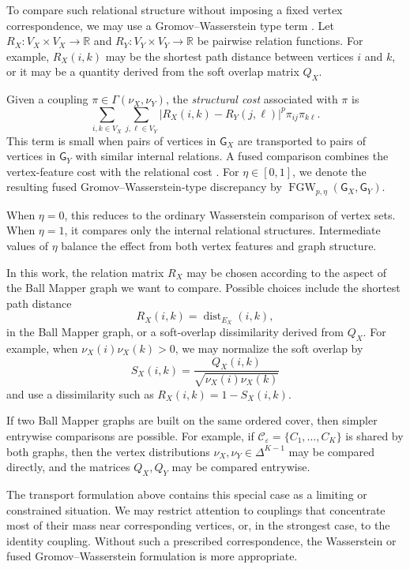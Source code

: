 \documentclass[9pt,a4paper,twocolumn,twoside]{extarticle}
\theoremstyle{definition}
\begin{document}
To compare such relational structure without imposing a fixed vertex correspondence, we may use a Gromov--Wasserstein type term \cite{memoli2011gromov}. Let $R_X:V_X\times V_X\to\mathbb R$ and $R_Y:V_Y\times V_Y\to\mathbb R$ be pairwise relation functions. For example, $R_X(i,k)$ may be the shortest path distance between vertices $i$ and $k$, or it may be a quantity derived from the soft overlap matrix $Q_X$.

Given a coupling $\pi \in \Gamma(\nu_X,\nu_Y)$, the \emph{structural cost} associated with $\pi$ is
\[
\sum_{i,k\in V_X}\sum_{j,\ell\in V_Y}\left|R_X(i,k)-R_Y(j,\ell)\right|^p \pi_{ij}\pi_{k\ell}.
\]
This term is small when pairs of vertices in $\mathsf G_X$ are transported to pairs of vertices in $\mathsf G_Y$ with similar internal relations. A fused comparison combines the vertex-feature cost with the relational cost \cite{vayer2019optimal}.  For $\eta\in[0,1]$, we denote the resulting fused Gromov--Wasserstein-type discrepancy by $\operatorname{FGW}_{p,\eta}(\mathsf{G}_X,\mathsf{G}_Y)$.

When $\eta=0$, this reduces to the ordinary Wasserstein comparison of vertex sets. When $\eta = 1$, it compares only the internal relational structures. Intermediate values of $\eta$ balance the effect from both vertex features and graph structure.

In this work, the relation matrix $R_X$ may be chosen according to the aspect of the Ball Mapper graph we want to compare. Possible choices include the shortest path distance
\[
R_X(i,k)=\operatorname{dist}_{E_X}(i,k),
\]
in the Ball Mapper graph, or a soft-overlap dissimilarity derived from $Q_X$. For example, when $\nu_X(i)\nu_X(k)>0$, we may normalize the soft overlap by
\[
S_X(i,k) =\frac{Q_X(i,k)}{\sqrt{\nu_X(i)\nu_X(k)}}
\]
and use a dissimilarity such as $R_X(i,k) = 1 - S_X(i,k)$.

If two Ball Mapper graphs are built on the same ordered cover, then simpler entrywise comparisons are possible. For example, if $\mathcal C_\varepsilon = \{C_1,\dots,C_K\}$ is shared by both graphs, then the vertex distributions $\nu_X,\nu_Y\in\Delta^{K-1}$ may be compared directly, and the matrices $Q_X,Q_Y$ may be compared entrywise.

The transport formulation above contains this special case as a limiting or constrained situation. We may restrict attention to couplings that concentrate most of their mass near corresponding vertices, or, in the strongest case, to the identity coupling. Without such a prescribed correspondence, the Wasserstein or fused Gromov--Wasserstein formulation is more appropriate.
\end{document}
